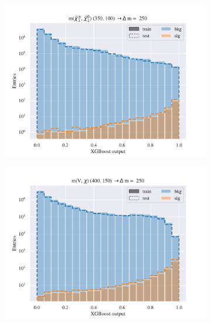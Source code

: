 \begin{figure}[H]
\begin{subfigure}[t!]{0.49\textwidth}
        \includegraphics[width = \textwidth]{Figures/WW/BDT/Low_level/Inter/scaled_train_test_395320.pdf}
        \caption{}
        \label{fig:traintestscaled}
    \end{subfigure}
    \begin{subfigure}[t!]{0.49\textwidth}
        \includegraphics[width = \textwidth]{Figures/Mono_Z/ML/BDT/Low_level/Inter/scaled_train_test_310613.pdf}
        \caption{}
        \label{fig:ROCBDTLow_low_level}
    \end{subfigure}
    \caption{}
    \label{fig:Non}
\end{figure}

